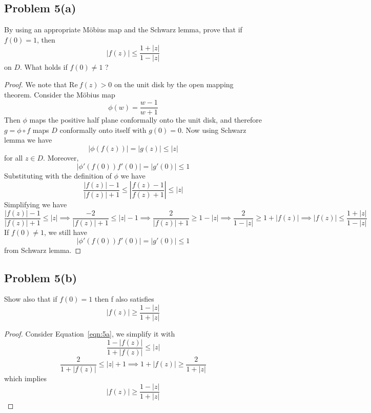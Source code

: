 \documentclass{article}[12pt]
\begin{document}
\subsection*{Problem 5(a)} By using an appropriate M\"obius map and
the Schwarz lemma, prove that if $f(0) = 1$, then
\[
|f(z)| \le \frac{1+|z|}{1-|z|}
\]
on $D$. What holds if $f(0)\ne 1$ ?
\begin{proof}
We note that $\mbox{Re}\ f(z) > 0$ on the unit disk by the 
open mapping theorem. Consider the M\"obius map 
\[
\phi(w) = \frac{w-1}{w+1}
\]
Then $\phi$ maps the positive half plane conformally onto the
unit disk, and therefore $g=\phi \circ f$ maps $D$ conformally
onto itself with $g(0)=0$. Now using Schwarz lemma we have
\[
|\phi(f(z))|=|g(z)| \le |z|
\] 
for all $z\in D$.
Moreover, 
\[
|\phi'(f(0))f'(0)| = |g'(0)| \le 1
\]
Substituting with the definition of $\phi$ we have
\begin{equation}
\frac{|f(z)|-1}{|f(z)|+1} \le |\frac{f(z)-1}{f(z)+1}| \le |z| \label{eqn:5a}
\end{equation}
Simplifying we have
\[
\frac{|f(z)|-1}{|f(z)|+1} \le |z| \implies 
\frac{-2}{|f(z)|+1} \le |z|-1 \implies 
\frac{2}{|f(z)|+1} \ge 1-|z| \implies 
\frac{2}{1-|z|} \ge 1+|f(z)| \implies 
|f(z)| \le \frac{1+|z|}{1-|z|}
\]
If $f(0)\ne 1$, we still have
\[
|\phi'(f(0))f'(0)| = |g'(0)| \le 1
\]
from Schwarz lemma.
\end{proof}

\subsection*{Problem 5(b)}Show also that if $f(0)=1$ then f also
satisfies
\[
|f(z)| \ge \frac{1-|z|}{1+|z|}
\]
\begin{proof}
Consider Equation~\ref{eqn:5a}, we simplify it with 
\[
\frac{1-|f(z)|}{1+|f(z)|} \le |z|
\]
\[
\frac{2}{1+|f(z)|} \le |z|+1 \implies 1+|f(z)| \ge \frac{2}{1+|z|}
\]
which implies
\[
|f(z)| \ge \frac{1-|z|}{1+|z|}
\]
\end{proof}
\end{document}
